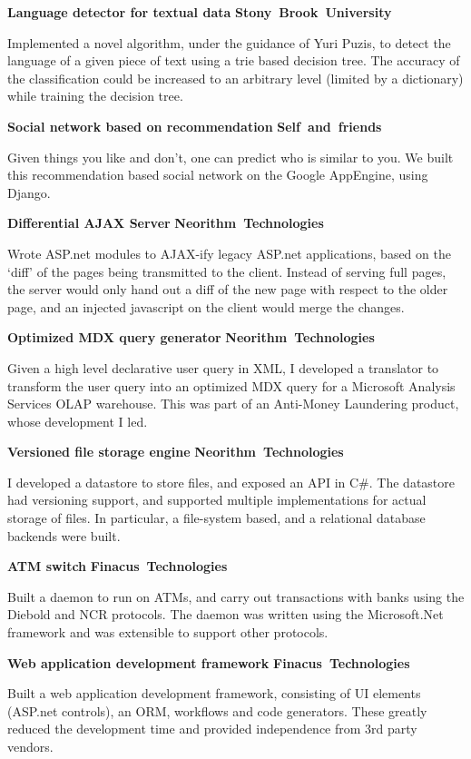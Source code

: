\documentclass[a4paper,11pt,final]{article}
\newcommand{\projexp}[2]{%
  \vspace{12pt}
  \noindent\textbf{{#1}}
  \hfill
  \hbox{\textbf{{#2}}}
  \\ \vspace{-12pt}
}
\begin{document}
\projexp{Language detector for textual data}{Stony Brook University}

\noindent Implemented a novel algorithm, under the guidance of Yuri
Puzis, to detect the language of a given piece of text using a trie
based decision tree. The accuracy of the classification could be
increased to an arbitrary level (limited by a dictionary) while
training the decision tree.

\projexp{Social network based on recommendation}{Self and friends}

\noindent Given things you like and don't, one can predict who is
similar to you. We built this recommendation based social network on
the Google AppEngine, using Django.

\projexp{Differential AJAX Server}{Neorithm Technologies}

\noindent Wrote ASP.net modules to AJAX-ify legacy ASP.net applications,
based on the `diff' of the pages being transmitted to the
client. Instead of serving full pages, the server would only hand out
a diff of the new page with respect to the older page, and an injected
javascript on the client would merge the changes.

\projexp{Optimized MDX query generator}{Neorithm Technologies}

\noindent Given a high level declarative user query in XML, I
developed a translator to transform the user query into an optimized
MDX query for a Microsoft Analysis Services OLAP warehouse. This was
part of an Anti-Money Laundering product, whose development I led.

\projexp{Versioned file storage engine}{Neorithm Technologies}

\noindent I developed a datastore to store files, and exposed an API
in C\#. The datastore had versioning support, and supported multiple
implementations for actual storage of files. In particular, a
file-system based, and a relational database backends were built.

\projexp{ATM switch}{Finacus Technologies} 

\noindent Built a daemon to run on ATMs, and carry out transactions
with banks using the Diebold and NCR protocols. The daemon was written
using the Microsoft.Net framework and was extensible to support other
protocols.

\projexp{Web application development framework}{Finacus Technologies}

\noindent Built a web application development framework, consisting of
UI elements (ASP.net controls), an ORM, workflows and code
generators. These greatly reduced the development time and provided
independence from 3rd party vendors.
\end{document}
